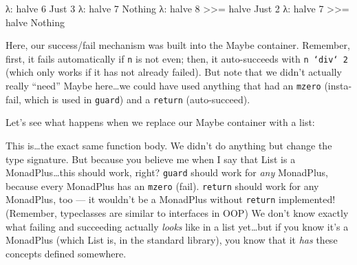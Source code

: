 \documentclass[]{article}
\newenvironment{Shaded}{}{}
\newcommand{\KeywordTok}[1]{\textcolor[rgb]{0.00,0.44,0.13}{\textbf{{#1}}}}
\newcommand{\DataTypeTok}[1]{\textcolor[rgb]{0.56,0.13,0.00}{{#1}}}
\newcommand{\DecValTok}[1]{\textcolor[rgb]{0.25,0.63,0.44}{{#1}}}
\newcommand{\OtherTok}[1]{\textcolor[rgb]{0.00,0.44,0.13}{{#1}}}
\newcommand{\FunctionTok}[1]{\textcolor[rgb]{0.02,0.16,0.49}{{#1}}}
\newcommand{\NormalTok}[1]{{#1}}
\begin{document}
\begin{Shaded}
\begin{Highlighting}[]
\NormalTok{λ}\FunctionTok{:} \NormalTok{halve }\DecValTok{6}
\DataTypeTok{Just} \DecValTok{3}
\NormalTok{λ}\FunctionTok{:} \NormalTok{halve }\DecValTok{7}
\DataTypeTok{Nothing}
\NormalTok{λ}\FunctionTok{:} \NormalTok{halve }\DecValTok{8} \FunctionTok{>>=} \NormalTok{halve}
\DataTypeTok{Just} \DecValTok{2}
\NormalTok{λ}\FunctionTok{:} \NormalTok{halve }\DecValTok{7} \FunctionTok{>>=} \NormalTok{halve}
\DataTypeTok{Nothing}
\end{Highlighting}
\end{Shaded}

Here, our success/fail mechanism was built into the Maybe container. Remember, first, it fails
automatically if \texttt{n} is not even; then, it auto-succeeds with \texttt{n\ `div`\ 2} (which
only works if it has not already failed). But note that we didn't actually really ``need'' Maybe
here\ldots{}we could have used anything that had an \texttt{mzero} (insta-fail, which is used in
\texttt{guard}) and a \texttt{return} (auto-succeed).

Let's see what happens when we replace our Maybe container with a list:

\begin{Shaded}
\end{Shaded}

This is\ldots{}the exact same function body. We didn't do anything but change the type signature.
But because you believe me when I say that List is a MonadPlus\ldots{}this should work, right?
\texttt{guard} should work for \emph{any} MonadPlus, because every MonadPlus has an \texttt{mzero}
(fail). \texttt{return} should work for any MonadPlus, too --- it wouldn't be a MonadPlus without
\texttt{return} implemented! (Remember, typeclasses are similar to interfaces in OOP) We don't know
exactly what failing and succeeding actually \emph{looks} like in a list yet\ldots{}but if you know
it's a MonadPlus (which List is, in the standard library), you know that it \emph{has} these
concepts defined somewhere.
\end{document}

